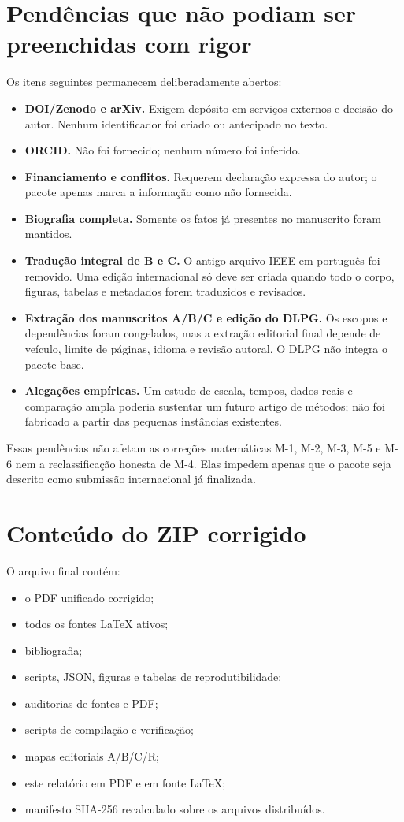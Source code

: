 \documentclass[11pt,a4paper]{article}
\begin{document}
\section{Pendências que não podiam ser preenchidas com rigor}

Os itens seguintes permanecem deliberadamente abertos:

\begin{itemize}
  \item \textbf{DOI/Zenodo e arXiv.} Exigem depósito em serviços externos e decisão do
  autor. Nenhum identificador foi criado ou antecipado no texto.
  \item \textbf{ORCID.} Não foi fornecido; nenhum número foi inferido.
  \item \textbf{Financiamento e conflitos.} Requerem declaração expressa do autor; o
  pacote apenas marca a informação como não fornecida.
  \item \textbf{Biografia completa.} Somente os fatos já presentes no manuscrito foram
  mantidos.
  \item \textbf{Tradução integral de B e C.} O antigo arquivo IEEE em português foi
  removido. Uma edição internacional só deve ser criada quando todo o corpo, figuras,
  tabelas e metadados forem traduzidos e revisados.
  \item \textbf{Extração dos manuscritos A/B/C e edição do DLPG.} Os escopos e
  dependências foram congelados, mas a extração editorial final depende de veículo,
  limite de páginas, idioma e revisão autoral. O DLPG não integra o pacote-base.
  \item \textbf{Alegações empíricas.} Um estudo de escala, tempos, dados reais e
  comparação ampla poderia sustentar um futuro artigo de métodos; não foi fabricado a
  partir das pequenas instâncias existentes.
\end{itemize}

Essas pendências não afetam as correções matemáticas M-1, M-2, M-3, M-5 e M-6 nem a
reclassificação honesta de M-4. Elas impedem apenas que o pacote seja descrito como
submissão internacional já finalizada.

\section{Conteúdo do ZIP corrigido}

O arquivo final contém:
\begin{itemize}
  \item o PDF unificado corrigido;
  \item todos os fontes LaTeX ativos;
  \item bibliografia;
  \item scripts, JSON, figuras e tabelas de reprodutibilidade;
  \item auditorias de fontes e PDF;
  \item scripts de compilação e verificação;
  \item mapas editoriais A/B/C/R;
  \item este relatório em PDF e em fonte LaTeX;
  \item manifesto SHA-256 recalculado sobre os arquivos distribuídos.
\end{itemize}
\end{document}
